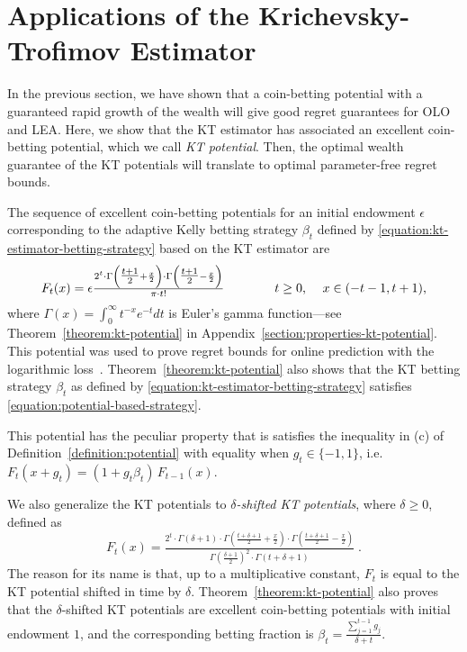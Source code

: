 \section{Applications of the Krichevsky-Trofimov Estimator}
\label{section:kt-estimator}

In the previous section, we have shown that a coin-betting potential with a
guaranteed rapid growth of the wealth will give good regret guarantees for
\ac{OLO} and \ac{LEA}. Here, we show that the KT estimator has associated an
excellent coin-betting potential, which we call \emph{KT potential}.  Then, the
optimal wealth guarantee of the KT potentials will translate to optimal
parameter-free regret bounds.

The sequence of excellent coin-betting potentials for an initial endowment $\epsilon$
corresponding to the adaptive Kelly betting strategy
$\beta_t$ defined by \eqref{equation:kt-estimator-betting-strategy}
based on the KT estimator are
\begin{equation}
\label{equation:kt-estimator-potential}
F_t(x) = \epsilon \tfrac{2^t \cdot \Gamma \left( \tfrac{t+1}{2} + \frac{x}{2} \right) \cdot \Gamma \left( \tfrac{t+1}{2} - \frac{x}{2} \right)}{\pi \cdot t!}
\qquad \qquad \text{$t \ge 0$, \quad $x \in \left(-t-1, t+1\right)$,}
\end{equation}
where $\Gamma(x) = \int_0^\infty t^{-x} e^{-t} dt$ is Euler's gamma
function---see Theorem~\ref{theorem:kt-potential} in
Appendix~\ref{section:properties-kt-potential}.  This potential was used to
prove regret bounds for online prediction with the logarithmic
loss~\cite{Krichevsky-Trofimov-1981}\cite[Chapter
9.7]{Cesa-Bianchi-Lugosi-2006}.  Theorem~\ref{theorem:kt-potential} also shows
that the KT betting strategy $\beta_t$ as defined by
\eqref{equation:kt-estimator-betting-strategy} satisfies
\eqref{equation:potential-based-strategy}.

This potential has the peculiar property that is satisfies the inequality in
(c) of Definition~\ref{definition:potential} with equality when $g_t\in
\{-1,1\}$, i.e. $F_t(x+g_t)=(1+g_t \beta_t) \, F_{t-1}(x)$.

We also generalize the KT potentials to \emph{$\delta$-shifted KT
potentials}, where $\delta\geq0$, defined as
\[
F_t(x) = \tfrac{2^t \cdot \Gamma\left(\delta + 1 \right) \cdot \Gamma\left(\tfrac{t+\delta+1}{2} + \frac{x}{2} \right) \cdot \Gamma\left(\tfrac{t+\delta+1}{2} - \frac{x}{2} \right)}{\Gamma\left(\tfrac{\delta+1}{2} \right)^2 \cdot \Gamma \left(t+\delta+1\right)} \; .
\]
The reason for its name is that, up to a multiplicative constant, $F_t$ is
equal to the KT potential shifted in time by $\delta$.
Theorem~\ref{theorem:kt-potential} also proves that the $\delta$-shifted KT
potentials are excellent coin-betting potentials with initial endowment $1$, and
the corresponding betting fraction is $\beta_t = \tfrac{\sum_{j=1}^{t-1}
g_j}{\delta+t}$.

